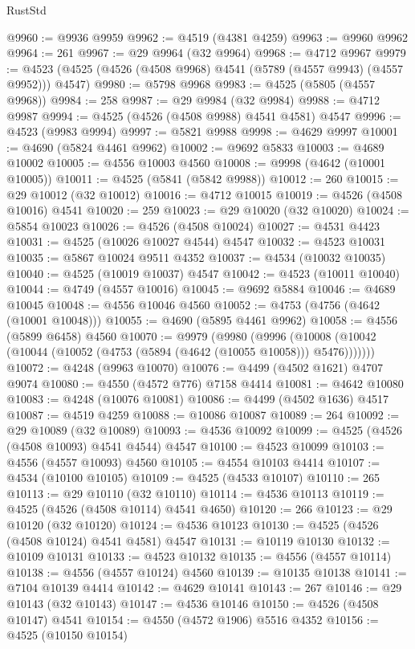 \begin{lexlean}{RustStd}
\begin{coremodule}
@9960 := @9936 @9959
@9962 := @4519 (@4381 @4259)
@9963 := @9960 @9962
@9964 := 261
@9967 := @29 @9964 (@32 @9964)
@9968 := @4712 @9967
@9979 := @4523 (@4525 (@4526 (@4508 @9968) @4541 (@5789 (@4557 @9943) (@4557 @9952))) @4547)
@9980 := @5798 @9968
@9983 := @4525 (@5805 (@4557 @9968))
@9984 := 258
@9987 := @29 @9984 (@32 @9984)
@9988 := @4712 @9987
@9994 := @4525 (@4526 (@4508 @9988) @4541 @4581) @4547
@9996 := @4523 (@9983 @9994)
@9997 := @5821 @9988
@9998 := @4629 @9997
@10001 := @4690 (@5824 @4461 @9962)
@10002 := @9692 @5833
@10003 := @4689 @10002
@10005 := @4556 @10003 @4560
@10008 := @9998 (@4642 (@10001 @10005))
@10011 := @4525 (@5841 (@5842 @9988))
@10012 := 260
@10015 := @29 @10012 (@32 @10012)
@10016 := @4712 @10015
@10019 := @4526 (@4508 @10016) @4541
@10020 := 259
@10023 := @29 @10020 (@32 @10020)
@10024 := @5854 @10023
@10026 := @4526 (@4508 @10024)
@10027 := @4531 @4423
@10031 := @4525 (@10026 @10027 @4544) @4547
@10032 := @4523 @10031
@10035 := @5867 @10024 @9511 @4352
@10037 := @4534 (@10032 @10035)
@10040 := @4525 (@10019 @10037) @4547
@10042 := @4523 (@10011 @10040)
@10044 := @4749 (@4557 @10016)
@10045 := @9692 @5884
@10046 := @4689 @10045
@10048 := @4556 @10046 @4560
@10052 := @4753 (@4756 (@4642 (@10001 @10048)))
@10055 := @4690 (@5895 @4461 @9962)
@10058 := @4556 (@5899 @6458) @4560
@10070 := @9979
    (@9980
      (@9996 (@10008 (@10042 (@10044 (@10052 (@4753 (@5894 (@4642 (@10055 @10058))) @5476)))))))
@10072 := @4248 (@9963 @10070)
@10076 := @4499 (@4502 @1621) @4707 @9074
@10080 := @4550 (@4572 @776) @7158 @4414
@10081 := @4642 @10080
@10083 := @4248 (@10076 @10081)
@10086 := @4499 (@4502 @1636) @4517
@10087 := @4519 @4259
@10088 := @10086 @10087
@10089 := 264
@10092 := @29 @10089 (@32 @10089)
@10093 := @4536 @10092
@10099 := @4525 (@4526 (@4508 @10093) @4541 @4544) @4547
@10100 := @4523 @10099
@10103 := @4556 (@4557 @10093) @4560
@10105 := @4554 @10103 @4414
@10107 := @4534 (@10100 @10105)
@10109 := @4525 (@4533 @10107)
@10110 := 265
@10113 := @29 @10110 (@32 @10110)
@10114 := @4536 @10113
@10119 := @4525 (@4526 (@4508 @10114) @4541 @4650)
@10120 := 266
@10123 := @29 @10120 (@32 @10120)
@10124 := @4536 @10123
@10130 := @4525 (@4526 (@4508 @10124) @4541 @4581) @4547
@10131 := @10119 @10130
@10132 := @10109 @10131
@10133 := @4523 @10132
@10135 := @4556 (@4557 @10114)
@10138 := @4556 (@4557 @10124) @4560
@10139 := @10135 @10138
@10141 := @7104 @10139 @4414
@10142 := @4629 @10141
@10143 := 267
@10146 := @29 @10143 (@32 @10143)
@10147 := @4536 @10146
@10150 := @4526 (@4508 @10147) @4541
@10154 := @4550 (@4572 @1906) @5516 @4352
@10156 := @4525 (@10150 @10154)

\end{coremodule}
\end{lexlean}
